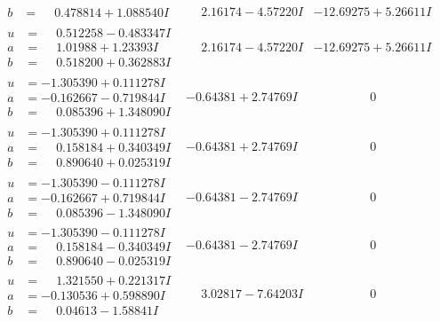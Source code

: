 \documentclass[1p]{elsarticle_modified}
\theoremstyle{definition}
\begin{document}
$$\begin{array}{c|c|c}
\begin{aligned}
b &= \phantom{-}0.478814 + 1.088540 I\end{aligned}
 & \phantom{-}2.16174 - 4.57220 I & -12.69275 + 5.26611 I \\ \hline\begin{aligned}
u &= \phantom{-}0.512258 - 0.483347 I \\
a &= \phantom{-}1.01988 + 1.23393 I \\
b &= \phantom{-}0.518200 + 0.362883 I\end{aligned}
 & \phantom{-}2.16174 - 4.57220 I & -12.69275 + 5.26611 I \\ \hline\begin{aligned}
u &= -1.305390 + 0.111278 I \\
a &= -0.162667 - 0.719844 I \\
b &= \phantom{-}0.085396 + 1.348090 I\end{aligned}
 & -0.64381 + 2.74769 I & \phantom{-0.000000 } 0 \\ \hline\begin{aligned}
u &= -1.305390 + 0.111278 I \\
a &= \phantom{-}0.158184 + 0.340349 I \\
b &= \phantom{-}0.890640 + 0.025319 I\end{aligned}
 & -0.64381 + 2.74769 I & \phantom{-0.000000 } 0 \\ \hline\begin{aligned}
u &= -1.305390 - 0.111278 I \\
a &= -0.162667 + 0.719844 I \\
b &= \phantom{-}0.085396 - 1.348090 I\end{aligned}
 & -0.64381 - 2.74769 I & \phantom{-0.000000 } 0 \\ \hline\begin{aligned}
u &= -1.305390 - 0.111278 I \\
a &= \phantom{-}0.158184 - 0.340349 I \\
b &= \phantom{-}0.890640 - 0.025319 I\end{aligned}
 & -0.64381 - 2.74769 I & \phantom{-0.000000 } 0 \\ \hline\begin{aligned}
u &= \phantom{-}1.321550 + 0.221317 I \\
a &= -0.130536 + 0.598890 I \\
b &= \phantom{-}0.04613 - 1.58841 I\end{aligned}
 & \phantom{-}3.02817 - 7.64203 I & \phantom{-0.000000 } 0 \\ \hline\begin{aligned}

\end{aligned}
\end{array}$$
\end{document}
